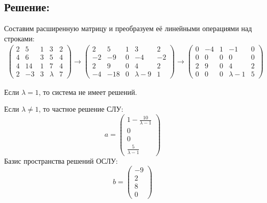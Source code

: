 \documentclass[12pt]{article}
\begin{document}
    \subsection*{Решение:}
    Составим расширенную матрицу и преобразуем её линейными операциями над строками:
    \begin{gather*}
        \begin{pmatrix}
            2 & 5  & 1 & 3       & 2 \\
            4 & 6  & 3 & 5       & 4 \\
            4 & 14 & 1 & 7       & 4 \\
            2 & -3 & 3 & \lambda & 7
        \end{pmatrix}
        \rightarrow
        \begin{pmatrix}
            2  & 5   & 1 & 3         & 2  \\
            -2 & -9  & 0 & -4        & -2 \\
            2  & 9   & 0 & 4         & 2  \\
            -4 & -18 & 0 & \lambda-9 & 1
        \end{pmatrix}
        \rightarrow
        \begin{pmatrix}
            0 & -4 & 1 & -1          & 0 \\
            0 & 0  & 0 & 0           & 0 \\
            2 & 9  & 0 & 4           & 2 \\
            0 & 0  & 0 & \lambda - 1 & 5
        \end{pmatrix}
    \end{gather*}

    Если $\lambda = 1$, то система не имеет решений.

    Если $\lambda \neq 1$, то частное решение СЛУ:
    \[
        a =
        \begin{pmatrix}
            1 - \frac{10}{\lambda - 1} \\
            0                          \\
            0                          \\
            \frac{5}{\lambda - 1}
        \end{pmatrix}
    \]
    Базис пространства решений ОСЛУ:
    \[
        b =
        \begin{pmatrix}
            - 9 \\ 2 \\ 8 \\ 0
        \end{pmatrix}
    \]
\end{document}
